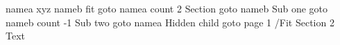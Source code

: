  
\pdfdest name{a} xyz \pdfdest name{b} fit
\pdfoutline goto name{a} count 2 {Section}
\pdfoutline goto name{b} {Sub one}
\pdfoutline goto name{b} count -1 {Sub two}
\pdfoutline goto name{a} {Hidden child}
\pdfoutline goto page 1 {/Fit} {Section 2}
Text\bye
